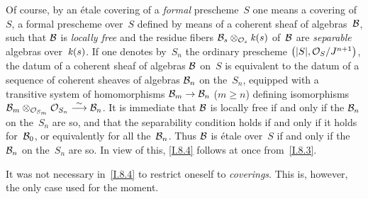 Of course, by an \'etale covering of a \emph{formal}
prescheme~$S$ one means a covering of~$S$, \ie a formal
prescheme over~$S$ defined by means of a coherent sheaf
of algebras~$\cal{B}$, such that $\cal{B}$ is \emph{locally
free} and the residue fibers
$\cal{B}_s\otimes_{\cal{O}_s}\kres(s)$ of~$\cal{B}$ are
\emph{separable} algebras over~$\kres(s)$. If one denotes
by~$S_n$ the ordinary prescheme
$\big(|S|,\cal{O}_S/J^{n+1}\big)$, the datum of a coherent
sheaf of algebras $\cal{B}$ on~$S$ is equivalent to the datum
of a sequence of coherent sheaves of algebras $\cal{B}_n$
on the~$S_n$, equipped with a transitive system of
homomorphisms $\cal{B}_m\to\cal{B}_n$ ($m\geq n$) defining
isomorphisms
$\cal{B}_m\otimes_{\cal{O}_{S_m}}\cal{O}_{S_n}\isomto\cal{B}_n$.
It is immediate that $\cal{B}$ is locally free if and only
if the $\cal{B}_n$ on the~$S_n$ are so, and that the
separability condition holds if and only if it holds
for~$\cal{B}_0$, or equivalently for all the~$\cal{B}_n$.
Thus $\cal{B}$ is \'etale over~$S$ if and only if the
$\cal{B}_n$ on the~$S_n$ are so. In view of this,
\ref{I.8.4} follows at once from~\ref{I.8.3}.

\begin{remark}
It was not necessary in~\ref{I.8.4} to restrict oneself
to \emph{coverings}. This is, however, the only case used
for the moment.
\end{remark}
